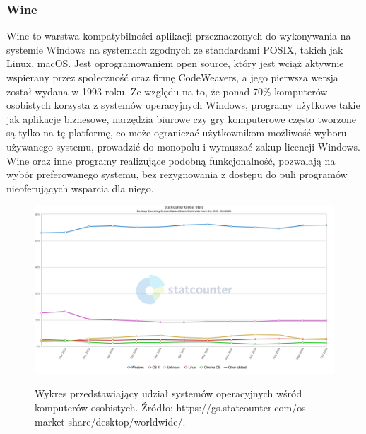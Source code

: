 \subsubsection{Wine\cite{wine}}
Wine to warstwa kompatybilności aplikacji przeznaczonych do wykonywania na systemie Windows na systemach zgodnych ze standardami POSIX, takich jak Linux, macOS. Jest oprogramowaniem open source, który jest wciąż aktywnie wspierany przez społeczność oraz firmę CodeWeavers, a jego pierwsza wersja został wydana w 1993 roku. Ze względu na to, że ponad 70\% komputerów osobistych korzysta z systemów operacyjnych Windows\cite{windowsMarketShare}, programy użytkowe takie jak aplikacje biznesowe, narzędzia biurowe czy gry komputerowe często tworzone są tylko na tę platformę, co może ograniczać użytkownikom możliwość wyboru używanego systemu, prowadzić do monopolu i wymuszać zakup licencji Windows. Wine oraz inne programy realizujące podobną funkcjonalność, pozwalają na wybór preferowanego systemu, bez rezygnowania z dostępu do puli programów nieoferujących wsparcia dla niego.

\begin{figure}[!h]
	\begin{center}
		\resizebox{1\textwidth}{!} {
			\includegraphics{img/3/desktop-os-market-share.png}
		}
		\caption{Wykres przedstawiający udział systemów operacyjnych wśród komputerów osobistych. Źródło: https://gs.statcounter.com/os-market-share/desktop/worldwide/.}
		\label{diagram-aktywnosci-worker}
	\end{center}
\end{figure}


